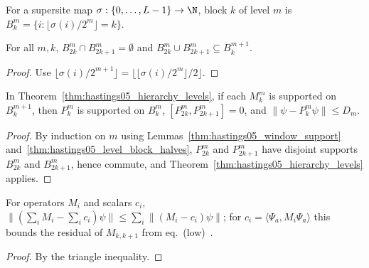\begin{definition}
    \label{def:hastings05_level_block}
    \leanok
    For a supersite map $\sigma:\{0,\dots,L-1\}\to\N$, block $k$ of level $m$
    is $B_k^m=\{i:\lfloor\sigma(i)/2^m\rfloor=k\}$.
\end{definition}

\begin{lemma}
    \label{thm:hastings05_level_block_halves}
    \leanok
    For all $m,k$, $B_{2k}^m\cap B_{2k+1}^m=\emptyset$ and
    $B_{2k}^m\cup B_{2k+1}^m\subseteq B_k^{m+1}$.
\end{lemma}
\begin{proof}\leanok
    Use $\lfloor\sigma(i)/2^{m+1}\rfloor=\lfloor\lfloor\sigma(i)/2^m\rfloor/2\rfloor$.
\end{proof}

\begin{lemma}
    \label{thm:hastings05_supersite_hierarchy}
    \leanok
    In Theorem~\ref{thm:hastings05_hierarchy_levels}, if each $M_k^m$ is
    supported on $B_k^{m+1}$, then $P_k^m$ is supported on $B_k^m$,
    $[P_{2k}^m,P_{2k+1}^m]=0$, and $\lVert\psi-P_k^m\psi\rVert\le D_m$.
\end{lemma}
\begin{proof}\leanok
    By induction on $m$ using Lemmas~\ref{thm:hastings05_window_support}
    and~\ref{thm:hastings05_level_block_halves}, $P_{2k}^m$ and $P_{2k+1}^m$
    have disjoint supports $B_{2k}^m$ and $B_{2k+1}^m$, hence commute, and
    Theorem~\ref{thm:hastings05_hierarchy_levels} applies.
\end{proof}

\begin{lemma}
    \label{thm:hastings05_sum_residual}
    \leanok
    For operators $M_i$ and scalars $c_i$,
    $\lVert(\sum_iM_i-\sum_ic_i)\psi\rVert\le\sum_i\lVert(M_i-c_i)\psi\rVert$;
    for $c_i=\langle\Psi_a,M_i\Psi_a\rangle$ this bounds the residual of
    $M_{k,k+1}$ from eq.~(low)~\cite[lines 628--639]{Hastings2006Solving}.
\end{lemma}
\begin{proof}\leanok
    By the triangle inequality.
\end{proof}

